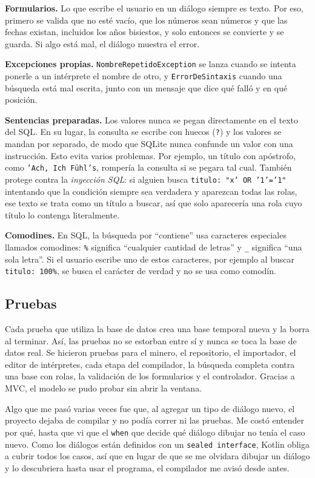 \documentclass[12pt,letterpaper]{article}
\begin{document}
\textbf{Formularios.} Lo que escribe el usuario en un diálogo siempre es
texto. Por eso, primero se valida que no esté vacío, que los números sean
números y que las fechas existan, incluidos los años bisiestos, y solo
entonces se convierte y se guarda. Si algo está mal, el diálogo muestra el
error.

\textbf{Excepciones propias.} \texttt{NombreRepetidoException} se lanza
cuando se intenta ponerle a un intérprete el nombre de otro, y
\texttt{ErrorDeSintaxis} cuando una búsqueda está mal escrita, junto con
un mensaje que dice qué falló y en qué posición.

\textbf{Sentencias preparadas.} Los valores nunca se pegan directamente en
el texto del SQL. En su lugar, la consulta se escribe con huecos
(\texttt{?}) y los valores se mandan por separado, de modo que SQLite
nunca confunde un valor con una instrucción. Esto evita varios problemas.
Por ejemplo, un título con apóstrofo, como \texttt{'Ach, Ich Fühl's},
rompería la consulta si se pegara tal cual. También protege contra la
\emph{inyección SQL}: si alguien busca \texttt{titulo: "x' OR '1'='1"}
intentando que la condición siempre sea verdadera y aparezcan todas las
rolas, ese texto se trata como un título a buscar, así que solo aparecería
una rola cuyo título lo contenga literalmente.

\textbf{Comodines.} En SQL, la búsqueda por ``contiene'' usa caracteres
especiales llamados comodines: \texttt{\%} significa ``cualquier cantidad
de letras'' y \texttt{\_} significa ``una sola letra''. Si el usuario
escribe uno de estos caracteres, por ejemplo al buscar
\texttt{titulo: 100\%}, se busca el carácter de verdad y no se usa como
comodín.

\subsection{Pruebas}

Cada prueba que utiliza la base de datos crea una base temporal nueva y la
borra al terminar. Así, las pruebas no se estorban entre sí y nunca se
toca la base de datos real. Se hicieron pruebas para el minero, el
repositorio, el importador, el editor de intérpretes, cada etapa del
compilador, la búsqueda completa contra una base con rolas, la validación
de los formularios y el controlador. Gracias a MVC, el modelo se pudo
probar sin abrir la ventana.

Algo que me pasó varias veces fue que, al agregar un tipo de diálogo
nuevo, el proyecto dejaba de compilar y no podía correr ni las pruebas.
Me costó entender por qué, hasta que vi que el \texttt{when} que decide
qué diálogo dibujar no tenía el caso nuevo. Como los diálogos están
definidos con un \texttt{sealed interface}, Kotlin obliga a cubrir todos
los casos, así que en lugar de que se me olvidara dibujar un diálogo y lo
descubriera hasta usar el programa, el compilador me avisó desde antes.
\end{document}
